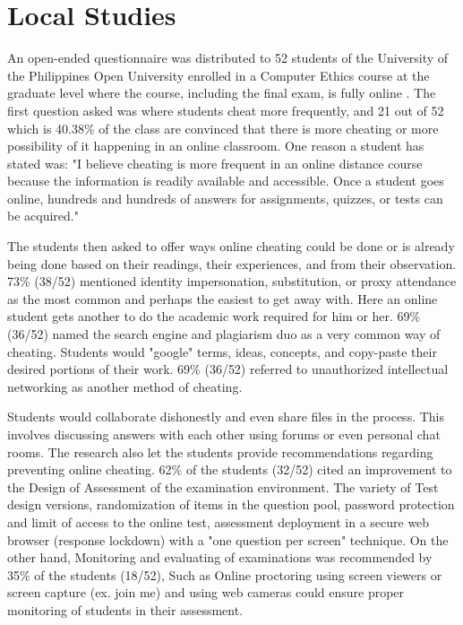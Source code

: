 \section{Local Studies}

An open-ended questionnaire was distributed to 52 students of the University of the Philippines Open University enrolled in a Computer Ethics course at the graduate level where the course, including the final exam, is fully online \cite{ravasco2012technology}.
The first question asked was where students cheat more frequently, and 21 out of 52 which is 40.38\% of the class are convinced that there is more cheating or more possibility of it happening in an online classroom.
One reason a student has stated was: "I believe cheating is more frequent in an online distance course because the information is readily available and accessible.
Once a student goes online, hundreds and hundreds of answers for assignments, quizzes, or tests can be acquired."

The students then asked to offer ways online cheating could be done or is already being done based on their readings, their experiences, and from their observation.
73\% (38/52) mentioned identity impersonation, substitution, or proxy attendance as the most common and perhaps the easiest to get away with.
Here an online student gets another to do the academic work required for him or her.
69\% (36/52) named the search engine and plagiarism duo as a very common way of cheating.
Students would "google" terms, ideas, concepts, and copy-paste their desired portions of their work.
69\% (36/52) referred to unauthorized intellectual networking as another method of cheating.

Students would collaborate dishonestly and even share files in the process.
This involves discussing answers with each other using forums or even personal chat rooms.
The research also let the students provide recommendations regarding preventing online cheating.
62\% of the students (32/52) cited an improvement to the Design of Assessment of the examination environment.
The variety of Test design versions, randomization of items in the question pool, password protection and limit of access to the online test, assessment deployment in a secure web browser (response lockdown) with a "one question per screen" technique.
On the other hand, Monitoring and evaluating of examinations was recommended by 35\% of the students (18/52), Such as Online proctoring using screen viewers or screen capture (ex. join me) and using web cameras could ensure proper monitoring of students in their assessment.

